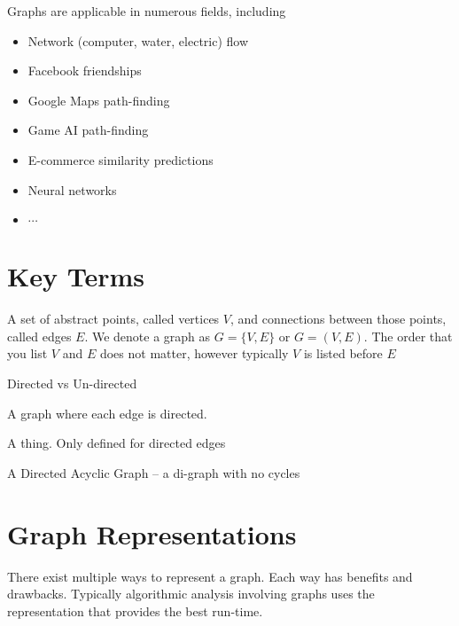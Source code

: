 \documentclass[main.tex]{subfiles}
\begin{document}
Graphs are applicable in numerous fields, including
\begin{itemize}
	\item Network (computer, water, electric) flow
	\item Facebook friendships
	\item Google Maps path-finding
	\item Game AI path-finding
	\item E-commerce similarity predictions
	\item Neural networks
	\item \(\cdots\)
\end{itemize}

\section{Key Terms}

\begin{defn}
	A set of abstract points, called vertices \(V\), and connections between those points, called edges \(E\). We denote a graph as \(G = \{V, E\}\) or \(G = (V, E)\). The order that you list \(V\) and \(E\) does not matter, however typically \(V\) is listed before \(E\)
\end{defn}

\begin{defn}[Vertex]

\end{defn}

\begin{defn}[Edge]
	Directed vs Un-directed
\end{defn}

\begin{defn}[Di-graph]
	A graph where each edge is directed.
\end{defn}

\begin{defn}[Cycle]
	A thing. Only defined for directed edges
\end{defn}

\begin{defn}[DAG]
	A Directed Acyclic Graph -- a di-graph with no cycles
\end{defn}

\section{Graph Representations}

There exist multiple ways to represent a graph. Each way has benefits and drawbacks. Typically algorithmic analysis involving graphs uses the representation that provides the best run-time.
\end{document}
